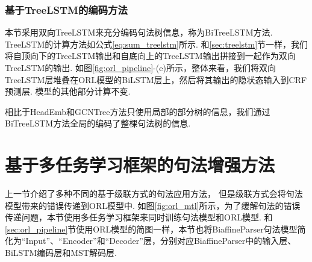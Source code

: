\subsubsection{基于TreeLSTM的编码方法}
本节采用双向TreeLSTM来充分编码句法树信息，称为BiTreeLSTM方法. TreeLSTM的计算方法如公式\ref{eq:sum_treelstm}所示. 和\ref{sec:treelstm}节一样，我们将自顶向下的TreeLSTM输出和自底向上的TreeLSTM输出拼接到一起作为双向TreeLSTM的输出.
%
%
如图\ref{fig:orl_pipeline}-(e)所示，整体来看，我们将双向TreeLSTM层堆叠在ORL模型的BiLSTM层上，然后将其输出的隐状态输入到CRF预测层. 模型的其他部分计算不变.

相比于HeadEmb和GCNTree方法只使用局部的部分树的信息，我们通过BiTreeLSTM方法全局的编码了整棵句法树的信息.

\section{基于多任务学习框架的句法增强方法}
\label{sec:orl_mtl}
%
上一节介绍了多种不同的基于级联方式的句法应用方法，
但是级联方式会将句法模型带来的错误传递到ORL模型中.
如图\ref{fig:orl_mtl}所示，为了缓解句法的错误传递问题，本节使用多任务学习框架来同时训练句法模型和ORL模型. 和\ref{sec:orl_pipeline}节使用ORL模型的简图一样，本节也将BiaffineParser句法模型简化为“Input”、“Encoder”和“Decoder”层，分别对应BiaffineParser中的输入层、BiLSTM编码层和MST解码层.

